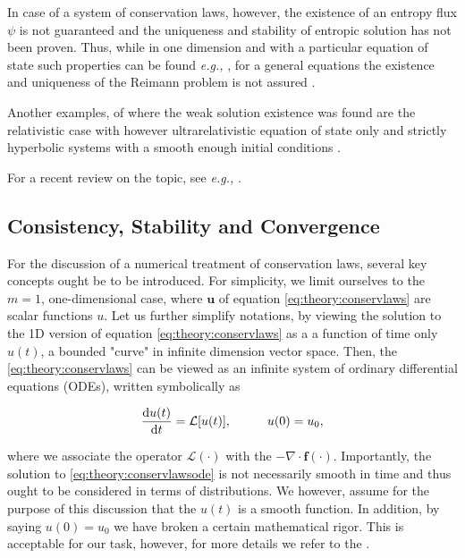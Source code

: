 \documentclass[11pt,a4paper,headinclude=true,DIV=14,BCOR=8mm,chapterprefix,listof=totoc,twoside,openright,abstracton]{scrbook}
\begin{document}
In case of a system of conservation laws, however, the existence of an entropy flux $\psi$ is not guaranteed and the uniqueness and stability of entropic solution has not been proven. 
Thus, while in one dimension and with a particular equation of state such properties can be found \textit{e.g.,} \cite{Chen:2009}, for a general equations the existence and uniqueness of the Reimann problem is not assured \cite{Curtis:1972}.

Another examples, of where the weak solution existence was found are the relativistic case \cite{Glimm:1965} with however ultrarelativistic equation of state only \cite{Smoller:1993} and strictly hyperbolic systems with a smooth enough initial conditions \cite{Lax:1957}.

For a recent review on the topic, see \textit{e.g.,} \cite{Chen:2006}. 


\subsection{Consistency, Stability and Convergence}

For the discussion of a numerical treatment of conservation laws, several key concepts ought be to be introduced. For simplicity, we limit ourselves to the $m=1$, one-dimensional case, where $\boldsymbol{u}$ of equation \ref{eq:theory:conservlaws} are scalar functions $u$. Let us further simplify notations, by viewing the solution to the 1D version of equation \ref{eq:theory:conservlaws} as a a function of time only $u(t)$, a bounded "curve" in infinite dimension vector space. Then, the \ref{eq:theory:conservlaws} can be viewed as an infinite system of ordinary differential equations (ODEs), written symbolically as

\begin{equation}
\frac{\text{d}u(t)}{\text{d}t} = \mathcal{L}[u(t)], \hspace{10mm} u(0) = u_0,
\label{eq:theory:conservlawsode}
\end{equation}

where we associate the operator $\mathcal{L}(\cdot)$ with the $-\nabla\cdot\boldsymbol{f}(\cdot)$. 
Importantly, the solution to \ref{eq:theory:conservlawsode} is not necessarily smooth in time and thus ought to be considered in terms of distributions. We however, assume for the purpose of this discussion that the $u(t)$ is a smooth function. In addition, by saying $u(0) = u_0$ we have broken a certain mathematical rigor. This is acceptable for our task, however, for more details we refer to the \cite{Kruzkov:1970}. 
\end{document}
